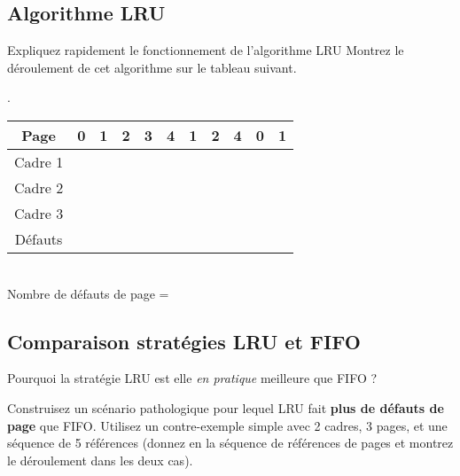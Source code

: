 \documentclass[11pt]{article}
\newcounter{cq}
\begin{document}
\vspace{-0.4cm}
\subsection{Algorithme LRU}
\vspace{-0.4cm}
Expliquez rapidement le fonctionnement de l'algorithme LRU
\newpage
Montrez le déroulement de cet algorithme sur le tableau suivant.
\begin{center}
\thecq.
\begin{tabular}{|c|c|c|c|c|c|c|c|c|c|c|}
\hline
Page & 0& 1& 2& 3& 4& 1& 2& 4& 0& 1 \\
\hline \hline
Cadre 1 &&&&&&&&&& \\ \hline
Cadre 2 &&&&&&&&&& \\ \hline
Cadre 3 &&&&&&&&&& \\ \hline
\hline
Défauts &&&&&&&&&& \\ \hline
\end{tabular}\\
Nombre de défauts de page =  
\end{center}

\vspace{-0.4cm}
\subsection{Comparaison stratégies LRU et FIFO}
\vspace{-0.4cm}
Pourquoi la stratégie LRU est elle \emph{en pratique} meilleure que FIFO ?


Construisez un scénario pathologique pour lequel LRU fait \textbf{plus de
défauts de page} que FIFO. Utilisez un contre-exemple simple avec 2 cadres, 3
pages, et une séquence de 5 références (donnez en la séquence de références de pages
et montrez le déroulement dans les deux cas).



\vspace{-0.4cm}
\end{document}
